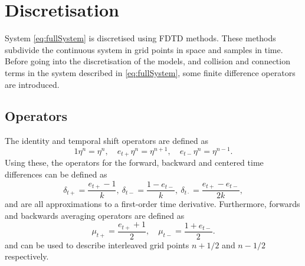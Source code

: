     
    \section{Discretisation}\label{sec:disc}
    System \eqref{eq:fullSystem} is discretised using FDTD methods. These methods subdivide the continuous system in grid points in space and samples %
    in time. Before going into the discretisation of the models, and collision and connection terms in the system described in \eqref{eq:fullSystem}, some finite difference operators are introduced.
    
    \subsection{Operators}
    The identity and temporal shift operators are defined as
    \begin{equation}
        1\eta^n = \eta^n, \quad e_{t+}\eta^n = \eta^{n+1}, \quad e_{t-}\eta^n = \eta^{n-1}.
    \end{equation}
    Using these, the operators for the forward, backward and centered time differences can be defined as
    \begin{equation}\label{eq:discTimeOperators}
        \delta_{t+} = \frac{e_{t+} - 1}{k},\ \delta_{t-} = \frac{1 - e_{t-}}{k},\ \delta_{t\cdot} = \frac{e_{t+}-e_{t-}}{2k},
    \end{equation}
    and are all approximations to a first-order time derivative. Furthermore, forwards and backwards averaging operators are defined as
    \begin{equation}
        \mu_{t+} = \frac{e_{t+} + 1}{2}, \quad \mu_{t-} = \frac{1 + e_{t-}}{2}.
    \end{equation}
    and can be used to describe interleaved grid points $n+1/2$ and $n-1/2$ respectively.
    
